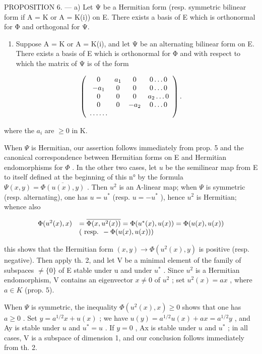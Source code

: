 PROPOSITION 6. --- a) Let Ψ be a Hermitian form (resp. symmetric bilinear form if A = K or A = K(i)) on E. There exists a basis of E which is orthonormal for Φ and orthogonal for Ψ.

\begin{enumerate}
\def\labelenumi{\alph{enumi})}
\setcounter{enumi}{1}
\tightlist
\item
  Suppose A = K or A = K(i), and let Ψ be an alternating bilinear form on E. There exists a basis of E which is orthonormal for Φ and with respect to which the matrix of Ψ is of the form
\end{enumerate}

\[
\left( \begin{array}{c c c c} 0 & a _ {1} & 0 & 0 \ldots 0 \\ - a _ {1} & 0 & 0 & 0 \ldots 0 \\ 0 & 0 & 0 & a _ {2} \ldots 0 \\ 0 & 0 & - a _ {2} & 0 \ldots 0 \\ \ldots \ldots \end{array} \right).
\]

where the \(a_{i}\) are \(\geqslant 0\) in K.

When \(\Psi\) is Hermitian, our assertion follows immediately from prop. 5 and the canonical correspondence between Hermitian forms on E and Hermitian endomorphisms for \(\Phi\) . In the other two cases, let \(u\) be the semilinear map from E to itself defined at the beginning of this n° by the formula \(\Psi(x, y) = \overline{\Phi(u(x), y)}\) . Then \(u^2\) is an A-linear map; when \(\Psi\) is symmetric (resp. alternating), one has \(u = u^*\) (resp. \(u = -u^*\) ), hence \(u^2\) is Hermitian; whence also

\[
\begin{array}{r l} \Phi (u ^ {2} (x), x) & = \overline {{\Phi (x , u ^ {2} (x))}} = \Phi (u ^ {*} (x), u (x)) = \Phi (u (x), u (x)) \\ & (\text { resp. } - \Phi (u (x), u (x))) \end{array}
\]

this shows that the Hermitian form \((x, y) \to \Phi(u^{2}(x), y)\) is positive (resp. negative). Then apply th. 2, and let V be a minimal element of the family of subspaces \(\neq\{0\}\) of E stable under u and under \(u^{*}\) . Since \(u^{2}\) is a Hermitian endomorphism, V contains an eigenvector \(x \neq 0\) of \(u^{2}\) ; set \(u^{2}(x) = ax\) , where \(a \in K\) (prop. 5).

When \(\Psi\) is symmetric, the inequality \(\Phi(u^{2}(x), x) \geqslant 0\) shows that one has \(a \geqslant 0\) . Set \(y = a^{1/2}x + u(x)\) ; we have \(u(y) = a^{1/2}u(x) + ax = a^{1/2}y\) , and Ay is stable under \(u\) and \(u^{*} = u\) . If \(y = 0\) , Ax is stable under \(u\) and \(u^{*}\) ; in all cases, V is a subspace of dimension 1, and our conclusion follows immediately from th. 2.

